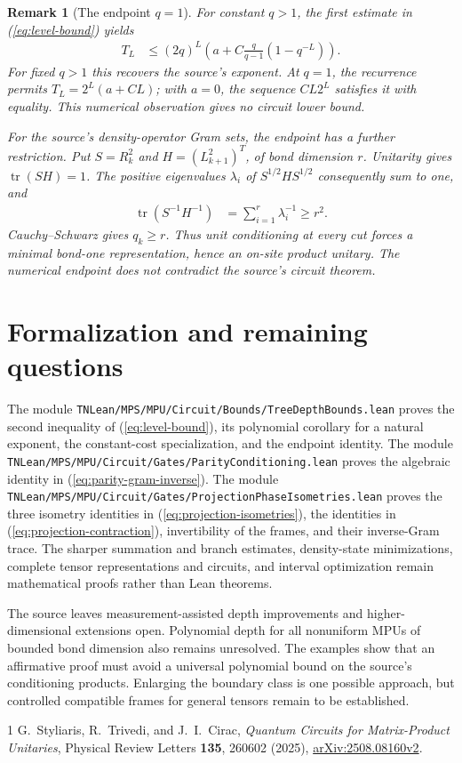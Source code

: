 \documentclass[11pt]{article}
\newtheorem{remark}[theorem]{Remark}
\begin{document}
\begin{remark}[The endpoint $q=1$]
For constant $q>1$, the first estimate in (\ref{eq:level-bound}) yields
\begin{align}
 T_L&\leq (2q)^L
      \left(a+C\frac{q}{q-1}(1-q^{-L})\right).
\end{align}
For fixed $q>1$ this recovers the source's exponent. At $q=1$, the
recurrence permits $T_L=2^L(a+CL)$; with $a=0$, the sequence $CL2^L$
satisfies it with equality. This numerical observation gives no circuit
lower bound.

For the source's density-operator Gram sets, the endpoint has a further
restriction. Put $S=R_k^2$ and $H=(L_{k+1}^2)^T$, of bond dimension $r$.
Unitarity gives $\operatorname{tr}(SH)=1$. The positive eigenvalues
$\lambda_i$ of $S^{1/2}HS^{1/2}$ consequently sum to one, and
\begin{align}
 \operatorname{tr}(S^{-1}H^{-1})
 &=\sum_{i=1}^r\lambda_i^{-1}\geq r^2.
\end{align}
Cauchy--Schwarz gives $q_k\geq r$. Thus unit conditioning at every cut
forces a minimal bond-one representation, hence an on-site product unitary.
The numerical endpoint does not contradict the source's circuit theorem.
\end{remark}

\section{Formalization and remaining questions}

The module \texttt{TNLean/MPS/MPU/Circuit/Bounds/TreeDepthBounds.lean} proves the second
inequality of (\ref{eq:level-bound}), its polynomial corollary for a natural
exponent, the constant-cost specialization, and the endpoint identity.
The module \texttt{TNLean/MPS/MPU/Circuit/Gates/ParityConditioning.lean} proves the
algebraic identity in (\ref{eq:parity-gram-inverse}). The module
\texttt{TNLean/MPS/MPU/Circuit/Gates/ProjectionPhaseIsometries.lean} proves the three
isometry identities in (\ref{eq:projection-isometries}), the identities in
(\ref{eq:projection-contraction}), invertibility of the frames, and their
inverse-Gram trace. The sharper summation and branch estimates, density-state
minimizations, complete tensor representations and circuits, and interval
optimization remain mathematical proofs rather than Lean theorems.

The source leaves measurement-assisted depth improvements and
higher-dimensional extensions open. Polynomial depth for all nonuniform
MPUs of bounded bond dimension also remains unresolved. The examples show
that an affirmative proof must avoid a universal polynomial bound on the
source's conditioning products. Enlarging the boundary class is one possible
approach, but controlled compatible frames for general tensors remain to be
established.

\begin{thebibliography}{1}
G.~Styliaris, R.~Trivedi, and J.~I.~Cirac,
\emph{Quantum Circuits for Matrix-Product Unitaries},
Physical Review Letters \textbf{135}, 260602 (2025),
\href{https://arxiv.org/abs/2508.08160}{arXiv:2508.08160v2}.
\end{thebibliography}
\end{document}
